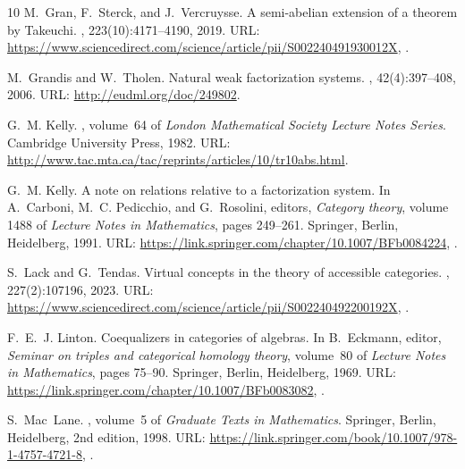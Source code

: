\documentclass[11pt]{article}
\theoremstyle{plain}
\theoremstyle{definition}
\numberwithin{equation}{section}
\begin{document}
{\begin{thebibliography}{10}
M.~Gran, F.~Sterck, and J.~Vercruysse.
\newblock A semi-abelian extension of a theorem by {Takeuchi}.
, 223(10):4171--4190, 2019.
\newblock URL: \url{https://www.sciencedirect.com/science/article/pii/S002240491930012X}, \href {https://doi.org/10.1016/j.jpaa.2019.01.004} {}.

M.~Grandis and W.~Tholen.
\newblock Natural weak factorization systems.
, 42(4):397--408, 2006.
\newblock URL: \url{http://eudml.org/doc/249802}.

G.~M. Kelly.
, volume~64 of {\em London {Mathematical} {Society} {Lecture} {Notes} {Series}}.
\newblock Cambridge University Press, 1982.
\newblock URL: \url{http://www.tac.mta.ca/tac/reprints/articles/10/tr10abs.html}.

G.~M. Kelly.
\newblock A note on relations relative to a factorization system.
\newblock In A.~Carboni, M.~C. Pedicchio, and G.~Rosolini, editors, {\em Category theory}, volume 1488 of {\em Lecture {Notes} in {Mathematics}}, pages 249--261. Springer, Berlin, Heidelberg, 1991.
\newblock URL: \url{https://link.springer.com/chapter/10.1007/BFb0084224}, \href {https://doi.org/10.1007/BFb0084224} {}.

S.~Lack and G.~Tendas.
\newblock Virtual concepts in the theory of accessible categories.
, 227(2):107196, 2023.
\newblock URL: \url{https://www.sciencedirect.com/science/article/pii/S002240492200192X}, \href {https://doi.org/10.1016/j.jpaa.2022.107196} {}.

F.~E.~J. Linton.
\newblock Coequalizers in categories of algebras.
\newblock In B.~Eckmann, editor, {\em Seminar on triples and categorical homology theory}, volume~80 of {\em Lecture {Notes} in {Mathematics}}, pages 75--90. Springer, Berlin, Heidelberg, 1969.
\newblock URL: \url{https://link.springer.com/chapter/10.1007/BFb0083082}, \href {https://doi.org/10.1007/BFb0083082} {}.

S.~Mac~Lane.
, volume~5 of {\em Graduate {Texts} in {Mathematics}}.
\newblock Springer, Berlin, Heidelberg, 2nd edition, 1998.
\newblock URL: \url{https://link.springer.com/book/10.1007/978-1-4757-4721-8}, \href {https://doi.org/10.1007/978-1-4757-4721-8} {}.


\end{thebibliography}}
\end{document}
